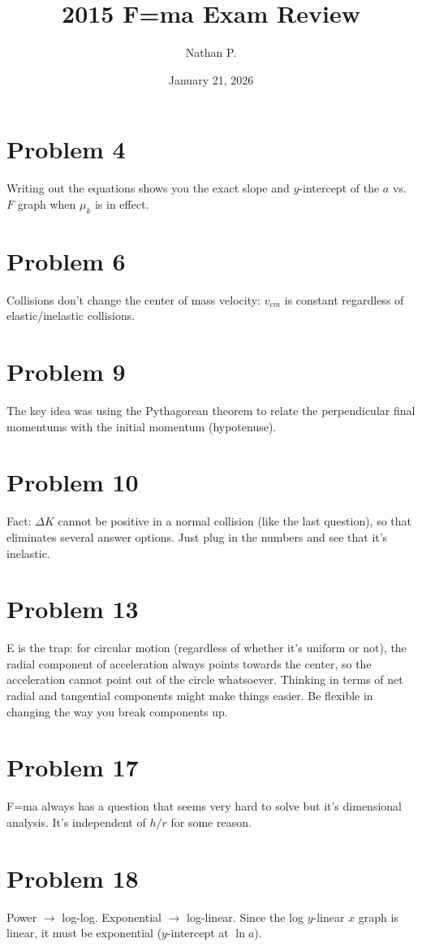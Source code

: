 \documentclass[11pt]{article}
\title{2015 F=ma Exam Review}
\author{Nathan P.}
\date{January 21, 2026}
\begin{document}
\maketitle

\section*{Problem 4}
Writing out the equations shows you the exact slope and $y$-intercept of the $a$ vs.\ $F$ graph when $\mu_k$ is in effect.

\section*{Problem 6}
Collisions don't change the center of mass velocity: $v_{cm}$ is constant regardless of elastic/inelastic collisions.

\section*{Problem 9}
The key idea was using the Pythagorean theorem to relate the perpendicular final momentums with the initial momentum (hypotenuse).

\section*{Problem 10}
Fact: $\Delta K$ cannot be positive in a normal collision (like the last question), so that eliminates several answer options.
Just plug in the numbers and see that it's inelastic.

\section*{Problem 13}
E is the trap: for circular motion (regardless of whether it's uniform or not), the radial component of acceleration always points towards the center, so the acceleration cannot point out of the circle whatsoever.
Thinking in terms of net radial and tangential components might make things easier. Be flexible in changing the way you break components up.

\section*{Problem 17}
F=ma always has a question that seems very hard to solve but it's dimensional analysis.
It's independent of $h/r$ for some reason.

\section*{Problem 18}
Power $\to$ log-log.
Exponential $\to$ log-linear.
Since the log $y$-linear $x$ graph is linear, it must be exponential ($y$-intercept at $\ln a$).
\end{document}
